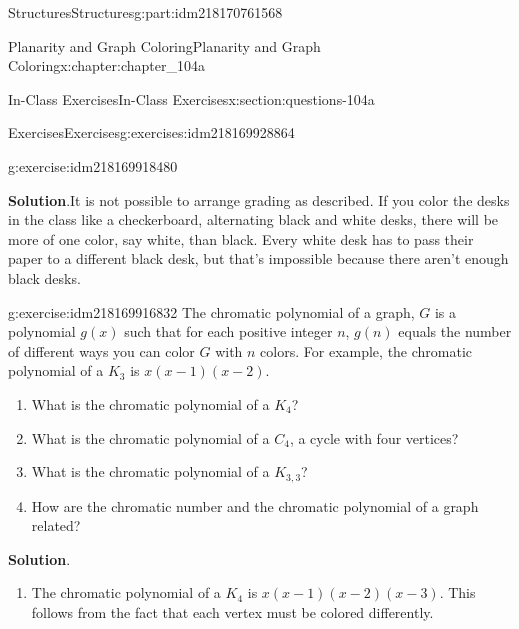 \documentclass[oneside,10pt,]{book}
\newcommand{\blocktitlefont}{\relax}
\numberwithin{equation}{section}
\begin{document}
\begin{partptx}{Structures}{}{Structures}{}{}{g:part:idm218170761568}
\begin{chapterptx}{Planarity and Graph Coloring}{}{Planarity and Graph Coloring}{}{}{x:chapter:chapter_104a}
\begin{sectionptx}{In-Class Exercises}{}{In-Class Exercises}{}{}{x:section:questions-104a}
\begin{exercises-subsection-numberless}{Exercises}{}{Exercises}{}{}{g:exercises:idm218169928864}
\begin{exercisegroup}
\begin{divisionexerciseeg}{4}{}{}{g:exercise:idm218169918480}
\par\smallskip%
\noindent\textbf{\blocktitlefont Solution}.\hypertarget{g:solution:idm218169917552}{}\quad{}It is not possible to arrange grading as described.  If you color the desks in the class like a checkerboard, alternating black and white desks, there will be more of one color, say white, than black. Every white desk has to pass their paper to a different black desk, but that's impossible because there aren't enough black desks.%
\end{divisionexerciseeg}%
\begin{divisionexerciseeg}{5}{}{}{g:exercise:idm218169916832}%
%
The chromatic polynomial of a graph, \(G\) is a polynomial \(g(x)\) such that for each positive integer \(n\), \(g(n)\) equals the number of different ways you can color \(G\) with \(n\) colors.  For example, the chromatic polynomial of a \(K_3\) is \(x(x-1)(x-2)\).%
\begin{enumerate}[label=(\alph*)]
\item{}What is the chromatic polynomial of a \(K_4\)?%
\item{}What is the chromatic polynomial of a \(C_4\), a cycle with four vertices?%
\item{}What is the chromatic polynomial of a \(K_{3,3}\)?%
\item{}How are the chromatic number and the chromatic polynomial of a graph related?%
\end{enumerate}
%
\par\smallskip%
\noindent\textbf{\blocktitlefont Solution}.\hypertarget{g:solution:idm218169916192}{}\quad{}%
\begin{enumerate}[label=(\alph*)]
\item{}The chromatic polynomial of a \(K_4\) is \(x(x-1)(x-2)(x-3)\). This follows from the fact that each vertex must be colored differently.%

\end{enumerate}
\end{divisionexerciseeg}
\end{exercisegroup}
\end{exercises-subsection-numberless}
\end{sectionptx}
\end{chapterptx}
\end{partptx}
\end{document}
